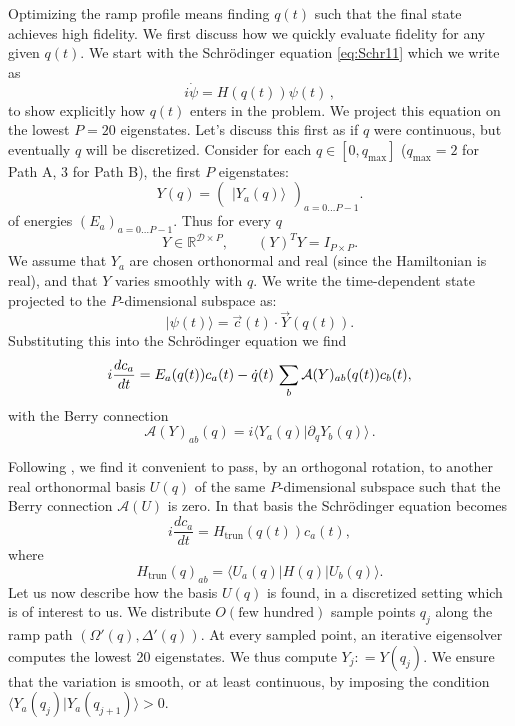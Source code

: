 \documentclass[a4paper,12pt]{article}
\theoremstyle{remark}
\theoremstyle{theorem}
\begin{document}
Optimizing the ramp profile means finding $q (t)$ such that the final state
achieves high fidelity. We first discuss how we quickly evaluate fidelity for any given $q(t)$.
We start with the Schr{\"o}dinger equation
\eqref{eq:Schr11} which we write as
\begin{equation}
	i \dot{\psi} = H (q (t)) \psi (t)\,,
\end{equation}
to show explicitly how $q (t)$ enters in the problem. We project this equation
on the lowest $P = 20$ eigenstates. Let's discuss this first as if $q$ were
continuous, but eventually $q$ will be discretized. Consider for each $q\in [0,q_{\max}]$ ($q_{\max}=2$ for Path A, $3$ for Path B), the first $P$ eigenstates:
\begin{equation}
	Y  (q) = \left(\begin{array}{c}
		|Y_a (q ) \rangle
	\end{array}\right)_{a = 0 \ldots P - 1}  .
\end{equation}
of energies $(E_a)_{a = 0 \ldots P - 1}$. Thus for every $q$
\begin{equation}
	Y   \in \mathbb{R}^{\mathcal{D} \times P}, \qquad (Y ^{})^T Y  = I_{P\times P} .
\end{equation}
We assume that $Y_a$ are chosen orthonormal and real (since the Hamiltonian is
real), and that $Y$ varies smoothly with $q$. We write the time-dependent
state projected to the $P$-dimensional subspace as:
\begin{equation}
	| \psi (t) \rangle = \vec{c} (t) \cdot \vec{Y} (q (t)) .
\end{equation}
Substituting this into the Schr{\"o}dinger equation we find
\begin{equation}
	i \frac{dc_a}{dt} = E_a (q (t)) c_a (t) - \dot{q} (t)  \hspace{0.17em}
	\sum_b \mathcal{A} (Y)_{ab} (q (t)) c_b (t),
\end{equation}
with the Berry connection
\begin{equation}
	\mathcal{A} (Y)_{ab} (q) = i \langle Y_a (q) | \partial_q Y_b (q) \rangle\,.
\end{equation}

Following {\cite{Kato1950}}, we find it convenient to pass, by an orthogonal
rotation, to another real orthonormal basis $U (q)$ of the same
$P$-dimensional subspace such that the Berry connection $\mathcal{A} (U)$ is
zero. In that basis the Schr{\"o}dinger equation becomes
\begin{equation}
	i \frac{dc_a}{dt} = H_{\text{trun}} (q (t))
	c_a (t), \label{SchrHU}
\end{equation}
where
\begin{equation}
	H_{\mathrm{trun}} (q)_{ab} = \langle U_a (q) |H (q) |U_b (q) \rangle .
	\label{HU}
\end{equation}
Let us now describe how the basis $U (q)$ is found, in a discretized setting
which is of interest to us. We distribute $O(\text{few hundred})$ sample points
$q_j$ along the ramp path $(\Omega' (q), \Delta' (q))$.  At every sampled
point, an iterative eigensolver computes the lowest 20 eigenstates. We thus
compute $Y_j : = Y (q_j)$. We ensure that the variation is smooth, or at least
continuous, by imposing the condition $\langle Y_a (q_j) |Y_a (q_{j + 1})
\rangle > 0$.
\end{document}
